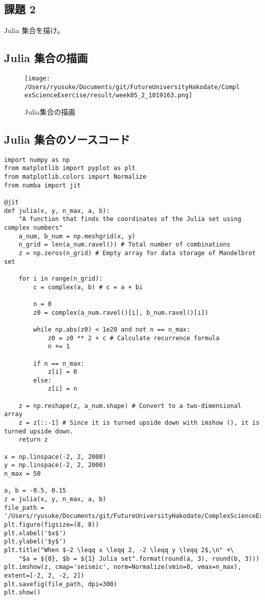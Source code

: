 \documentclass[a4j]{jsarticle}
\begin{document}
\newpage

\subsection{課題 2}
  Julia 集合を描け。\\

\subsection{Julia 集合の描画}
  \begin{figure}[htbp]
  \begin{center}
  \texttt{[image: /Users/ryusuke/Documents/git/FutureUniversityHakodate/ComplexScienceExercise/result/week05\_2\_1019163.png]}
  \caption{Julia集合の描画}
  \end{center}
  \end{figure}

\newpage

\subsection{Julia 集合のソースコード}

\begin{lstlisting}[caption=Pythonによるジュリア集合の描画]
import numpy as np
from matplotlib import pyplot as plt
from matplotlib.colors import Normalize
from numba import jit

@jit
def julia(x, y, n_max, a, b):
    "A function that finds the coordinates of the Julia set using complex numbers"
    a_num, b_num = np.meshgrid(x, y)
    n_grid = len(a_num.ravel()) # Total number of combinations
    z = np.zeros(n_grid) # Empty array for data storage of Mandelbrot set

    for i in range(n_grid):
        c = complex(a, b) # c = a + bi

        n = 0
        z0 = complex(a_num.ravel()[i], b_num.ravel()[i])

        while np.abs(z0) < 1e20 and not n == n_max:
            z0 = z0 ** 2 + c # Calculate recurrence formula
            n += 1

        if n == n_max:
            z[i] = 0
        else:
            z[i] = n

    z = np.reshape(z, a_num.shape) # Convert to a two-dimensional array
    z = z[::-1] # Since it is turned upside down with imshow (), it is turned upside down.
    return z

x = np.linspace(-2, 2, 2000)
y = np.linspace(-2, 2, 2000)
n_max = 50

a, b = -0.5, 0.15
z = julia(x, y, n_max, a, b)
file_path = '/Users/ryusuke/Documents/git/FutureUniversityHakodate/ComplexScienceExercise/result/week05_2_1019163'
plt.figure(figsize=(8, 8))
plt.xlabel('$x$')
plt.ylabel('$y$')
plt.title("When $-2 \leqq x \leqq 2, -2 \leqq y \leqq 2$,\n" +\
    "$a = ${0}, $b = ${1} Julia set".format(round(a, 3), round(b, 3)))
plt.imshow(z, cmap='seismic', norm=Normalize(vmin=0, vmax=n_max), extent=[-2, 2, -2, 2])
plt.savefig(file_path, dpi=300)
plt.show()
\end{lstlisting}
\end{document}
